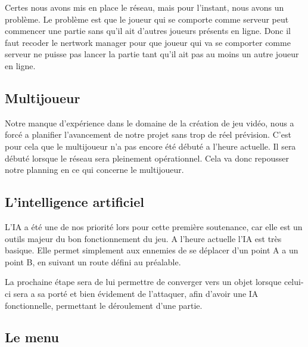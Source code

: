 \documentclass[a4paper, 12pt]{article}
\begin{document}
\par Certes nous avons mis en place le réseau, mais pour l’instant, nous avons un problème. Le problème est que le joueur qui se comporte comme serveur peut commencer une partie sans qu’il ait d’autres joueurs présents en ligne. Donc il faut recoder le nertwork manager  pour que joueur qui va se comporter comme serveur ne puisse pas lancer la partie tant qu’il ait pas au moins un autre joueur en ligne.

\newpage
	\subsection{Multijoueur}
	Notre manque d'expérience dans le domaine de la création de jeu vidéo, nous a forcé a planifier l'avancement de notre projet sans trop de réel prévision. C'est pour cela que le multijoueur n'a pas encore été débuté a l'heure actuelle. Il sera débuté lorsque le réseau sera pleinement opérationnel. Cela va donc repousser notre planning en ce qui concerne le multijoueur.
	
	\subsection{L'intelligence artificiel}
	L'IA a été une de nos priorité lors pour cette première soutenance, car elle est un outils majeur du bon fonctionnement du jeu. A l'heure actuelle l'IA est très basique. Elle permet simplement aux ennemies de se déplacer d'un point A a un point B, en suivant un route défini au préalable.
	\par La prochaine étape sera de lui permettre de converger vers un objet lorsque celui-ci sera a sa porté et bien évidement de l'attaquer, afin d'avoir une IA fonctionnelle, permettant le déroulement d'une partie.

	\subsection{Le menu}
	
\end{document}
